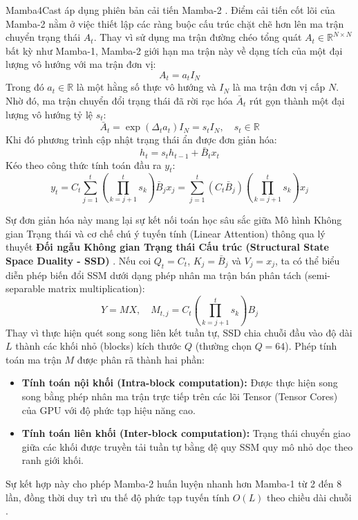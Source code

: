 Mamba4Cast áp dụng phiên bản cải tiến Mamba-2 \cite{dao2024}. Điểm cải tiến cốt lõi của Mamba-2 nằm ở việc thiết lập các ràng buộc cấu trúc chặt chẽ hơn lên ma trận chuyển trạng thái $A_t$. Thay vì sử dụng ma trận đường chéo tổng quát $A_t \in \mathbb{R}^{N \times N}$ bất kỳ như Mamba-1, Mamba-2 giới hạn ma trận này về dạng tích của một đại lượng vô hướng với ma trận đơn vị:
\begin{equation}
    A_t = a_t I_N
\end{equation}
Trong đó $a_t \in \mathbb{R}$ là một hằng số thực vô hướng và $I_N$ là ma trận đơn vị cấp $N$. Nhờ đó, ma trận chuyển đổi trạng thái đã rời rạc hóa $\bar{A}_t$ rút gọn thành một đại lượng vô hướng tỷ lệ $s_t$:
\begin{equation}
    \bar{A}_t = \exp(\Delta_t a_t) I_N = s_t I_N, \quad s_t \in \mathbb{R}
\end{equation}
Khi đó phương trình cập nhật trạng thái ẩn được đơn giản hóa:
\begin{equation}
    h_t = s_t h_{t-1} + \bar{B}_t x_t
\end{equation}
Kéo theo công thức tính toán đầu ra $y_t$:
\begin{equation}
    y_t = C_t \sum_{j=1}^{t} \left( \prod_{k=j+1}^{t} s_k \right) \bar{B}_j x_j = \sum_{j=1}^{t} (C_t \bar{B}_j) \left( \prod_{k=j+1}^{t} s_k \right) x_j
\end{equation}

Sự đơn giản hóa này mang lại sự kết nối toán học sâu sắc giữa Mô hình Không gian Trạng thái và cơ chế chú ý tuyến tính (Linear Attention) thông qua lý thuyết \textbf{Đối ngẫu Không gian Trạng thái Cấu trúc (Structural State Space Duality - SSD)} \cite{dao2024}. Nếu coi $Q_t = C_t$, $K_j = \bar{B}_j$ và $V_j = x_j$, ta có thể biểu diễn phép biến đổi SSM dưới dạng phép nhân ma trận bán phân tách (semi-separable matrix multiplication):
\begin{equation}
    Y = M X, \quad M_{t,j} = C_t \left( \prod_{k=j+1}^{t} s_k \right) B_j
\end{equation}
Thay vì thực hiện quét song song liên kết tuần tự, SSD chia chuỗi đầu vào độ dài $L$ thành các khối nhỏ (blocks) kích thước $Q$ (thường chọn $Q = 64$). Phép tính toán ma trận $M$ được phân rã thành hai phần:
\begin{itemize}
    \item \textbf{Tính toán nội khối (Intra-block computation):} Được thực hiện song song bằng phép nhân ma trận trực tiếp trên các lõi Tensor (Tensor Cores) của GPU với độ phức tạp hiệu năng cao.
    \item \textbf{Tính toán liên khối (Inter-block computation):} Trạng thái chuyển giao giữa các khối được truyền tải tuần tự bằng đệ quy SSM quy mô nhỏ dọc theo ranh giới khối.
\end{itemize}
Sự kết hợp này cho phép Mamba-2 huấn luyện nhanh hơn Mamba-1 từ 2 đến 8 lần, đồng thời duy trì ưu thế độ phức tạp tuyến tính $O(L)$ theo chiều dài chuỗi \cite{dao2024}.

